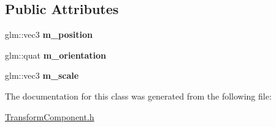 \subsection*{Public Attributes}
\begin{DoxyCompactItemize}
\item 
\mbox{\label{class_transform_component_a5a441b52ff5f18d940e3351e35868481}} 
glm\+::vec3 {\bfseries m\+\_\+position}
\item 
\mbox{\label{class_transform_component_a70f27f66f621e0e52e96e40ec168ede2}} 
glm\+::quat {\bfseries m\+\_\+orientation}
\item 
\mbox{\label{class_transform_component_a50d168d6290b29a66b21ce576fa44d59}} 
glm\+::vec3 {\bfseries m\+\_\+scale}
\end{DoxyCompactItemize}


The documentation for this class was generated from the following file\+:\begin{DoxyCompactItemize}
\item 
\mbox{\hyperlink{_transform_component_8h}{Transform\+Component.\+h}}\end{DoxyCompactItemize}
